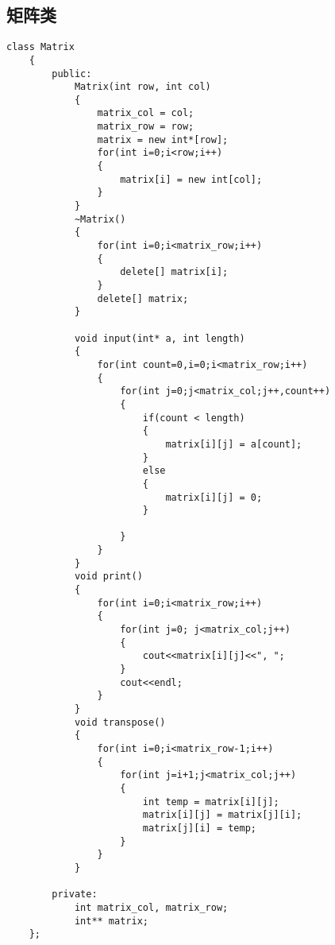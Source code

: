 \documentclass[UTF8]{ctexart}
\begin{document}
 \subsection{矩阵类}
\begin{lstlisting}[language={[ANSI]C++}]
    class Matrix
    {
        public:
            Matrix(int row, int col)
            {
                matrix_col = col;
                matrix_row = row;
                matrix = new int*[row];
                for(int i=0;i<row;i++)
                {
                    matrix[i] = new int[col];
                }
            }
            ~Matrix()
            {
                for(int i=0;i<matrix_row;i++)
                {
                    delete[] matrix[i];
                }
                delete[] matrix;
            }
    
            void input(int* a, int length)
            {
                for(int count=0,i=0;i<matrix_row;i++)
                {
                    for(int j=0;j<matrix_col;j++,count++)
                    {
                        if(count < length)
                        {
                            matrix[i][j] = a[count];
                        }
                        else
                        {
                            matrix[i][j] = 0;
                        }
                        
                    }
                }
            }
            void print()
            {
                for(int i=0;i<matrix_row;i++)
                {
                    for(int j=0; j<matrix_col;j++)
                    {
                        cout<<matrix[i][j]<<", ";
                    }
                    cout<<endl;
                }
            }
            void transpose()
            {
                for(int i=0;i<matrix_row-1;i++)
                {
                    for(int j=i+1;j<matrix_col;j++)
                    {
                        int temp = matrix[i][j];
                        matrix[i][j] = matrix[j][i];
                        matrix[j][i] = temp;
                    }
                }
            }
    
        private:
            int matrix_col, matrix_row;
            int** matrix;
    };

\end{lstlisting}
\end{document}
